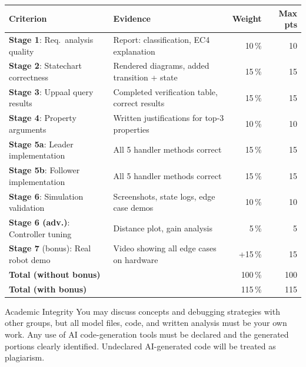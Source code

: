 \documentclass[11pt, a4paper]{article}
\begin{document}
\begin{center}
\footnotesize
\begin{tabularx}{\textwidth}{XXr@{\hspace{8pt}}r}
\toprule
\textbf{Criterion} & \textbf{Evidence} & \textbf{Weight} & \textbf{Max pts} \\
\midrule
\textbf{Stage 1}: Req.\ analysis quality
  & Report: classification, EC4 explanation
  & 10\,\% & 10 \\
\addlinespace
\textbf{Stage 2}: Statechart correctness
  & Rendered diagrams, added transition + state
  & 15\,\% & 15 \\
\addlinespace
\textbf{Stage 3}: Uppaal query results
  & Completed verification table, correct results
  & 15\,\% & 15 \\
\addlinespace
\textbf{Stage 4}: Property arguments
  & Written justifications for top-3 properties
  & 10\,\% & 10 \\
\addlinespace
\textbf{Stage 5a}: Leader implementation
  & All 5 handler methods correct
  & 15\,\% & 15 \\
\addlinespace
\textbf{Stage 5b}: Follower implementation
  & All 5 handler methods correct
  & 15\,\% & 15 \\
\addlinespace
\textbf{Stage 6}: Simulation validation
  & Screenshots, state logs, edge case demos
  & 10\,\% & 10 \\
\addlinespace
\textbf{Stage 6 (adv.)}: Controller tuning
  & Distance plot, gain analysis
  & 5\,\% & 5 \\
\addlinespace
\textbf{Stage 7} (bonus): Real robot demo
  & Video showing all edge cases on hardware
  & +15\,\% & 15 \\
\midrule
\textbf{Total (without bonus)} & & 100\,\% & 100 \\
\textbf{Total (with bonus)}    & & 115\,\% & 115 \\
\bottomrule
\end{tabularx}
\normalsize
\end{center}

\bigskip
\begin{infobox}{Academic Integrity}
You may discuss concepts and debugging strategies with other groups,
but all model files, code, and written analysis must be your own work.
Any use of AI code-generation tools must be declared and the generated
portions clearly identified. Undeclared AI-generated code will be
treated as plagiarism.
\end{infobox}

\newpage
\end{document}
